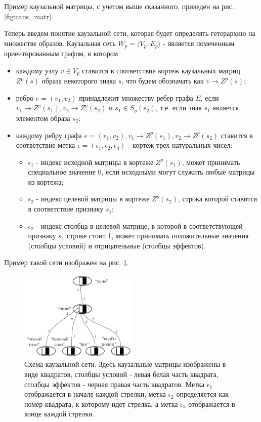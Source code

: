 \documentclass[12pt]{scrartcl}
\begin{document}
	Пример каузальной матрицы, с учетом выше сказанного, приведен на рис. \ref{fig:caus_matr}.
	
	Теперь введем понятие каузальной сети, которая будет определять гетерархию на множестве образов. Каузальная сеть $W_p=\langle V_p, E_p \rangle$ - является помеченным ориентированным графом, в котором
	\begin{itemize}
		\item каждому узлу $v\in V_p$ ставится в соответствие кортеж каузальных матриц $Z^p(s)$ образа некоторого знака $s$, что будем обозначать как $v\rightarrow Z^p(s)$;
		\item ребро $e=(v_1, v_2)$ принадлежит множеству ребер графа $E$, если $v_1\rightarrow Z^p(s_1), v_2\rightarrow Z^p(s_2)$ и $s_1\in S_p(s_2)$, т.е. если знак $s_1$ является элементом образа $s_2$;
		\item каждому ребру графа $e=(v_1, v_2), v_1\rightarrow Z^p(s_1), v_2\rightarrow Z^p(s_2)$ ставится в соответствие метка $\epsilon=(\epsilon_1,\epsilon_2,\epsilon_3)$ - кортеж трех натуральных чисел:
		\begin{itemize}
			\item $\epsilon_1$ - индекс исходной матрицы в кортеже $Z^p(s_1)$, может принимать специальное значение 0, если исходными могут служить любые матрицы из кортежа;
			\item $\epsilon_2$ - индекс целевой матрицы в кортеже $Z^p(s_2)$, строка которой ставится в соответствие признаку $s_1$;
			\item $\epsilon_2$ - индекс столбца в целевой матрице, в которой в соответствующей признаку $s_1$ строке стоит 1, может принимать положительные значения (столбцы условий) и отрицательные (столбцы эффектов).
		\end{itemize}		
	\end{itemize}
	
	Пример такой сети изображен на рис. \ref{fig:caus_net}.

	\begin{figure}[h]
		\centering
		\includegraphics[width=0.5\textwidth,page=1]{examples/causnet/caus_net}
		\caption{Схема каузальной сети. Здесь каузальные матрицы изображены в виде квадратов, столбцы условий - левая белая часть квадрата, столбцы эффектов - черная правая часть квадратов. Метка $\epsilon_1$ отображается в начале каждой стрелки, метка $\epsilon_2$ определяется как номер квадрата, к которому идет стрелка, а метка $\epsilon_3$ отображается в конце каждой стрелки.}
		\label{fig:caus_net}		
	\end{figure}
		
\end{document}
